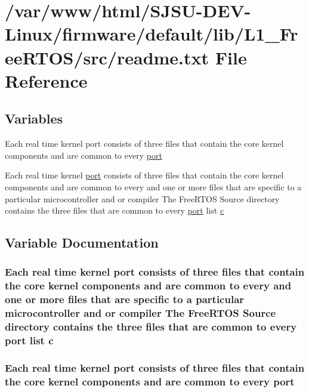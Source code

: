 \hypertarget{src_2readme_8txt}{}\section{/var/www/html/\+S\+J\+S\+U-\/\+D\+E\+V-\/\+Linux/firmware/default/lib/\+L1\+\_\+\+Free\+R\+T\+O\+S/src/readme.txt File Reference}
\label{src_2readme_8txt}
\subsection*{Variables}
\begin{DoxyCompactItemize}
\item 
Each real time kernel port consists of three files that contain the core kernel components and are common to every \hyperlink{src_2readme_8txt_ad59eab65e3184b472271cfd9dda30741}{port}
\item 
Each real time kernel \hyperlink{src_2readme_8txt_ad59eab65e3184b472271cfd9dda30741}{port} consists of three files that contain the core kernel components and are common to every and one or more files that are specific to a particular microcontroller and or compiler The Free\+R\+T\+OS Source directory contains the three files that are common to every \hyperlink{src_2readme_8txt_ad59eab65e3184b472271cfd9dda30741}{port} list \hyperlink{src_2readme_8txt_a3565228a924e4955bd0ad9d3804bab4a}{c}
\end{DoxyCompactItemize}


\subsection{Variable Documentation}
\subsubsection[{\texorpdfstring{c}{c}}]{\setlength{\rightskip}{0pt plus 5cm}Each real time kernel {\bf port} consists of three files that contain the core kernel components and are common to every and one or more files that are specific to a particular microcontroller and or compiler The Free\+R\+T\+OS Source directory contains the three files that are common to every {\bf port} list c}\hypertarget{src_2readme_8txt_a3565228a924e4955bd0ad9d3804bab4a}{}\label{src_2readme_8txt_a3565228a924e4955bd0ad9d3804bab4a}
\subsubsection[{\texorpdfstring{port}{port}}]{\setlength{\rightskip}{0pt plus 5cm}Each real time kernel port consists of three files that contain the core kernel components and are common to every port}\hypertarget{src_2readme_8txt_ad59eab65e3184b472271cfd9dda30741}{}\label{src_2readme_8txt_ad59eab65e3184b472271cfd9dda30741}

